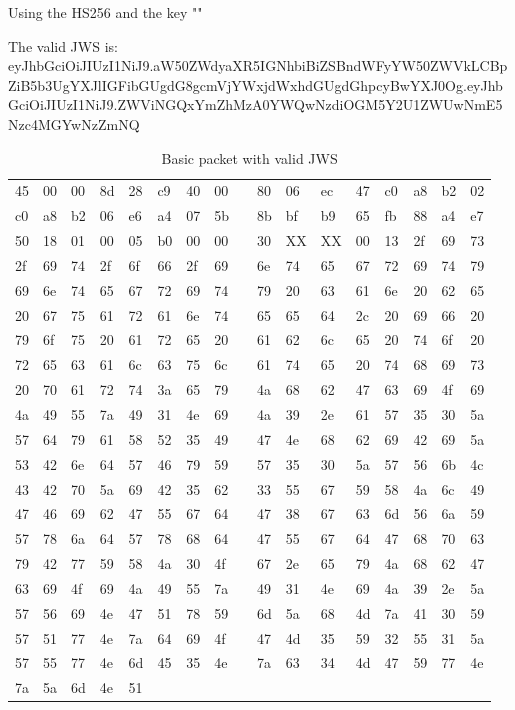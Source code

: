 Using the HS256 and the key ""


The valid JWS is: eyJhbGciOiJIUzI1NiJ9.aW50ZWdyaXR5IGNhbiBiZSBndWFyYW50ZWVkLCBpZiB5b3UgYXJlIGFibGUgdG8gcmVjYWxjdWxhdGUgdGhpcyBwYXJ0Og.eyJhbGciOiJIUzI1NiJ9.ZWViNGQxYmZhMzA0YWQwNzdiOGM5Y2U1ZWUwNmE5Nzc4MGYwNzZmNQ



\begin{table}[]
\centering
\begin{tabular}{lllllllllllllllll}
45 & 00 & 00 & 8d & 28 & c9 & 40 & 00 &  & 80 & 06 & ec & 47 & c0 & a8 & b2 & 02 \\
c0 & a8 & b2 & 06 & e6 & a4 & 07 & 5b &  & 8b & bf & b9 & 65 & fb & 88 & a4 & e7 \\
50 & 18 & 01 & 00 & 05 & b0 & 00 & 00 &  & 30 & XX & XX & 00 & 13 & 2f & 69 & 73 \\
2f & 69 & 74 & 2f & 6f & 66 & 2f & 69 &  & 6e & 74 & 65 & 67 & 72 & 69 & 74 & 79 \\
69 & 6e & 74 & 65 & 67 & 72 & 69 & 74 &  & 79 & 20 & 63 & 61 & 6e & 20 & 62 & 65 \\
20 & 67 & 75 & 61 & 72 & 61 & 6e & 74 &  & 65 & 65 & 64 & 2c & 20 & 69 & 66 & 20 \\
79 & 6f & 75 & 20 & 61 & 72 & 65 & 20 &  & 61 & 62 & 6c & 65 & 20 & 74 & 6f & 20 \\
72 & 65 & 63 & 61 & 6c & 63 & 75 & 6c &  & 61 & 74 & 65 & 20 & 74 & 68 & 69 & 73 \\
20 & 70 & 61 & 72 & 74 & 3a & 65 & 79 &  & 4a & 68 & 62 & 47 & 63 & 69 & 4f & 69 \\
4a & 49 & 55 & 7a & 49 & 31 & 4e & 69 &  & 4a & 39 & 2e & 61 & 57 & 35 & 30 & 5a \\
57 & 64 & 79 & 61 & 58 & 52 & 35 & 49 &  & 47 & 4e & 68 & 62 & 69 & 42 & 69 & 5a \\
53 & 42 & 6e & 64 & 57 & 46 & 79 & 59 &  & 57 & 35 & 30 & 5a & 57 & 56 & 6b & 4c \\
43 & 42 & 70 & 5a & 69 & 42 & 35 & 62 &  & 33 & 55 & 67 & 59 & 58 & 4a & 6c & 49 \\
47 & 46 & 69 & 62 & 47 & 55 & 67 & 64 &  & 47 & 38 & 67 & 63 & 6d & 56 & 6a & 59 \\
57 & 78 & 6a & 64 & 57 & 78 & 68 & 64 &  & 47 & 55 & 67 & 64 & 47 & 68 & 70 & 63 \\
79 & 42 & 77 & 59 & 58 & 4a & 30 & 4f &  & 67 & 2e & 65 & 79 & 4a & 68 & 62 & 47 \\
63 & 69 & 4f & 69 & 4a & 49 & 55 & 7a &  & 49 & 31 & 4e & 69 & 4a & 39 & 2e & 5a \\
57 & 56 & 69 & 4e & 47 & 51 & 78 & 59 &  & 6d & 5a & 68 & 4d & 7a & 41 & 30 & 59 \\
57 & 51 & 77 & 4e & 7a & 64 & 69 & 4f &  & 47 & 4d & 35 & 59 & 32 & 55 & 31 & 5a \\
57 & 55 & 77 & 4e & 6d & 45 & 35 & 4e &  & 7a & 63 & 34 & 4d & 47 & 59 & 77 & 4e \\
7a & 5a & 6d & 4e & 51
\end{tabular}
\caption{Basic packet with valid JWS}
\label{tab:my-table}
\end{table}
